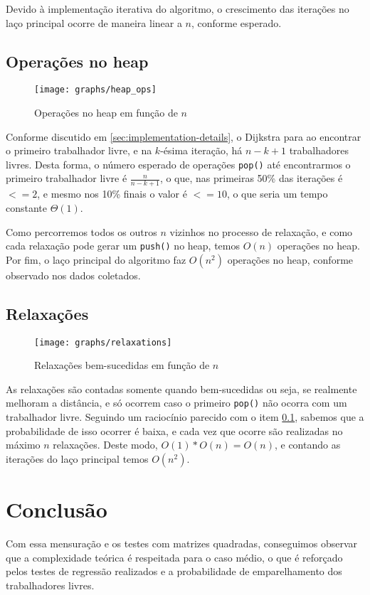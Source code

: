 \documentclass[11pt]{article}
\begin{document}
Devido à implementação iterativa do algoritmo, o crescimento das iterações no laço principal ocorre de maneira linear a $n$, conforme esperado.

\subsection{Operações no heap}
\label{sec:heap_ops}

\begin{figure}[H]
	\centering
	\caption{Operações no heap em função de $n$}
	\label{fig:heap_ops}
	\texttt{[image: graphs/heap\_ops]}
\end{figure}

Conforme discutido em \ref{sec:implementation-details}, o Dijkstra para ao encontrar o primeiro trabalhador livre, e na $k$-ésima iteração, há $n - k + 1$ trabalhadores livres.
Desta forma, o número esperado de operações \lstinline|pop()| até encontrarmos o primeiro trabalhador livre é $\frac{n}{n - k + 1}$, o que, nas primeiras 50\% das iterações é $<= 2$, e mesmo nos 10\% finais o valor é $<= 10$, o que seria um tempo constante $\Theta(1)$.

Como percorremos todos os outros $n$ vizinhos no processo de relaxação, e como cada relaxação pode gerar um \lstinline|push()| no heap, temos $O(n)$ operações no heap.
Por fim, o laço principal do algoritmo faz $O(n^2)$ operações no heap, conforme observado nos dados coletados.

\subsection{Relaxações}

\begin{figure}[H]
\centering
\caption{Relaxações bem-sucedidas em função de $n$}
\label{fig:relaxations}
\texttt{[image: graphs/relaxations]}
\end{figure}

As relaxações são contadas somente quando bem-sucedidas ou seja, se realmente melhoram a distância, e só ocorrem caso o primeiro \lstinline|pop()| não ocorra com um trabalhador livre. Seguindo um raciocínio parecido com o item \ref{sec:heap_ops}, sabemos que a probabilidade de isso ocorrer é baixa, e cada vez que ocorre são realizadas no máximo $n$ relaxações.
Deste modo, $O(1) * O(n) = O(n)$, e contando as iterações do laço principal temos $O(n^2)$.

\section{Conclusão}

Com essa mensuração e os testes com matrizes quadradas, conseguimos observar que a complexidade teórica é respeitada para o caso médio, o que é reforçado pelos testes de regressão realizados e a probabilidade de emparelhamento dos trabalhadores livres.
\end{document}
